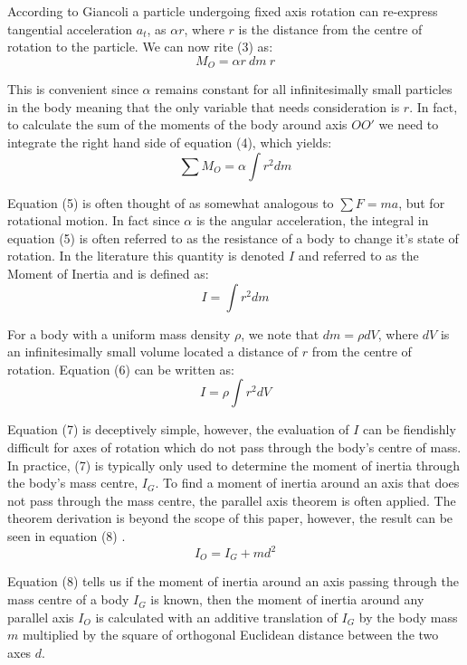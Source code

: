 \documentclass[a4paper]{article}
\begin{document}
According to Giancoli \cite{Giancoli:2000} a particle undergoing fixed axis rotation can re-express tangential acceleration $a_t$, as $\alpha r$, where $r$ is the distance from the centre of rotation to the particle. We can now rite (3) as:
\begin{equation}
M_O = \alpha r \ dm \ r
\end{equation}

This is convenient since $\alpha$ remains constant for all infinitesimally small particles in the body meaning that the only variable that needs consideration is $r$. In fact, to calculate the sum of the moments of the body around axis $OO'$ we need to integrate the right hand side of equation (4), which yields:
\begin{equation}
\sum M_O = \alpha \int r^2 dm
\end{equation}

Equation (5) is often thought of as somewhat analogous to $\sum F = ma$, but for rotational motion. In fact since $\alpha$ is the angular acceleration, the integral in equation (5) is often referred to as the resistance of a body to change it's state of rotation. In the literature this quantity is denoted $I$ and referred to as the Moment of Inertia and is defined as:
\begin{equation}
I = \int r^2 dm
\end{equation}

For a body with a uniform mass density $\rho$, we note that $dm = \rho dV$, where $dV$ is an infinitesimally small volume located a distance of $r$ from the centre of rotation. Equation (6) can be written as:
\begin{equation}
I = \rho \int r^2 dV 
\end{equation}

Equation (7) is deceptively simple, however, the evaluation of $I$ can be fiendishly difficult for axes of rotation which do not pass through the body's centre of mass. In practice, (7) is typically only used to determine the moment of inertia through the body's mass centre, $I_G$. To find a moment of inertia around an axis that does not pass through the mass centre, the parallel axis theorem is often applied. The theorem derivation is beyond the scope of this paper, however, the result can be seen in equation (8) \cite{Giancoli:2000}.
\begin{equation}
I_O = I_G + md^2
\end{equation}

Equation (8) tells us if the moment of inertia around an axis passing through the mass centre of a body $I_G$ is known, then the moment of inertia around any parallel axis $I_O$ is calculated with an additive translation of $I_G$ by the body mass $m$ multiplied by the square of orthogonal Euclidean distance between the two axes $d$.
\end{document}

